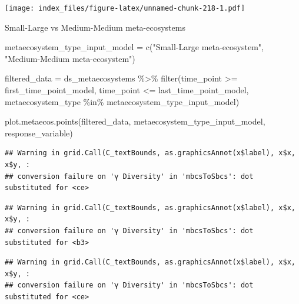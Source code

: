 \documentclass[
]{article}
\newenvironment{Shaded}{\begin{snugshade}}{\end{snugshade}}
\newcommand{\FunctionTok}[1]{\textcolor[rgb]{0.00,0.00,0.00}{#1}}
\newcommand{\NormalTok}[1]{#1}
\newcommand{\OtherTok}[1]{\textcolor[rgb]{0.56,0.35,0.01}{#1}}
\newcommand{\SpecialCharTok}[1]{\textcolor[rgb]{0.00,0.00,0.00}{#1}}
\newcommand{\StringTok}[1]{\textcolor[rgb]{0.31,0.60,0.02}{#1}}
\begin{document}
\texttt{[image: index\_files/figure-latex/unnamed-chunk-218-1.pdf]}

Small-Large vs Medium-Medium meta-ecosystems

\begin{Shaded}
\begin{Highlighting}[]
\NormalTok{metaecosystem\_type\_input\_model }\OtherTok{=} \FunctionTok{c}\NormalTok{(}\StringTok{"Small{-}Large meta{-}ecosystem"}\NormalTok{,}
                                   \StringTok{"Medium{-}Medium meta{-}ecosystem"}\NormalTok{)}
\end{Highlighting}
\end{Shaded}

\begin{Shaded}
\begin{Highlighting}[]
\NormalTok{filtered\_data }\OtherTok{=}\NormalTok{ ds\_metaecosystems }\SpecialCharTok{\%\textgreater{}\%}
                         \FunctionTok{filter}\NormalTok{(time\_point }\SpecialCharTok{\textgreater{}=}\NormalTok{ first\_time\_point\_model,}
\NormalTok{                                time\_point }\SpecialCharTok{\textless{}=}\NormalTok{ last\_time\_point\_model,}
\NormalTok{                                metaecosystem\_type }\SpecialCharTok{\%in\%}\NormalTok{ metaecosystem\_type\_input\_model)}
\end{Highlighting}
\end{Shaded}

\begin{Shaded}
\begin{Highlighting}[]
\FunctionTok{plot.metaecos.points}\NormalTok{(filtered\_data,}
\NormalTok{                     metaecosystem\_type\_input\_model,}
\NormalTok{                     response\_variable)}
\end{Highlighting}
\end{Shaded}

\begin{verbatim}
## Warning in grid.Call(C_textBounds, as.graphicsAnnot(x$label), x$x, x$y, :
## conversion failure on 'γ Diversity' in 'mbcsToSbcs': dot substituted for <ce>
\end{verbatim}

\begin{verbatim}
## Warning in grid.Call(C_textBounds, as.graphicsAnnot(x$label), x$x, x$y, :
## conversion failure on 'γ Diversity' in 'mbcsToSbcs': dot substituted for <b3>
\end{verbatim}

\begin{verbatim}
## Warning in grid.Call(C_textBounds, as.graphicsAnnot(x$label), x$x, x$y, :
## conversion failure on 'γ Diversity' in 'mbcsToSbcs': dot substituted for <ce>
\end{verbatim}
\end{document}
